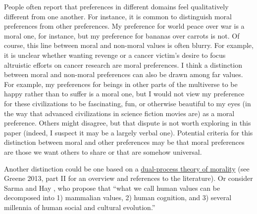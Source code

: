 People often report that preferences in different domains feel
qualitatively different from one another. For instance, it is common to
distinguish moral preferences from other preferences. My preference for
world peace over war is a moral one, for instance, but my preference for
bananas over carrots is not. Of course, this line between moral and non-moral
values is often blurry. For example, it is unclear whether wanting
revenge or a cancer victim's desire to focus altruistic efforts on
cancer research are moral preferences. I think a distinction between moral and non-moral preferences can also be
drawn among far values. For example, my preferences for beings in
other parts of the multiverse to be happy rather than to suffer is a
moral one, but I would not view my preference for these civilizations to
be fascinating, fun, or otherwise beautiful to my eyes (in the way that
advanced civilizations in science fiction movies are) as a moral
preference. Others might disagree, but that dispute is not worth
exploring in this paper (indeed, I suspect it may be a largely verbal
one). Potential criteria for this distinction between moral and other
preferences may be that moral preferences are those we want others to
share or that are somehow universal.

Another distinction could be one based on a
\href{https://en.wikipedia.org/wiki/Dual_process_theory_(moral_psychology)}{dual-process
theory of morality} (see Greene 2013, part II for an overview and
references to the literature). Or consider Sarma and Hay \citeyear{noauthor_undated-wg}, who propose
that ``what we call human values can be decomposed into 1) mammalian values, 2) human cognition, and
3) several millennia of human social and cultural evolution.''

